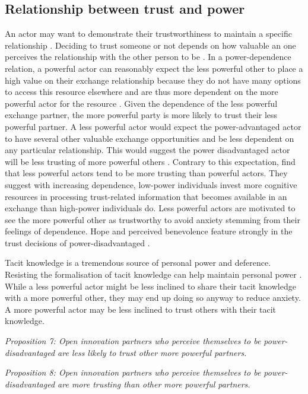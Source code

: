 \subsection{Relationship between trust and power}

An actor may want to demonstrate their trustworthiness to maintain a specific relationship \citep{schilke2015power}. Deciding to trust someone or not depends on how valuable an one perceives the relationship with the other person to be \citep{axelrod1984evolution}. In a power-dependence relation, a powerful actor can reasonably expect the less powerful other to place a high value on their exchange relationship because they do not have many options to access this resource elsewhere and are thus more dependent on the more powerful actor for the resource \citep{emerson1962power}. Given the dependence of the less powerful exchange partner, the more powerful party is more likely to trust their less powerful partner. A less powerful actor would expect the power-advantaged actor to have several other valuable exchange opportunities and be less dependent on any particular relationship. This would suggest the power disadvantaged actor will be less trusting of more powerful others \citep{schilke2015power}. Contrary to this expectation, \citet{schilke2015power} find that less powerful actors tend to be more trusting than powerful actors. They suggest with increasing dependence, low-power individuals invest more cognitive resources in processing trust-related information that becomes available in an exchange than high-power individuals do. Less powerful actors are motivated to see the more powerful other as trustworthy to avoid anxiety stemming from their feelings of dependence. Hope and perceived benevolence feature strongly in the trust decisions of power-disadvantaged \citep{schilke2015power}. \medskip

Tacit knowledge is a tremendous source of personal power and deference. Resisting the formalisation of tacit knowledge can help maintain personal power \citep{schultze2004knowing}. While a less powerful actor might be less inclined to share their tacit knowledge with a more powerful other, they may end up doing so anyway to reduce anxiety. A more powerful actor may be less inclined to trust others with their tacit knowledge. \medskip

\emph{Proposition 7: Open innovation partners who perceive themselves to be power-disadvantaged are less likely to trust other more powerful partners.}

\emph{Proposition 8: Open innovation partners who perceive themselves to be power-disadvantaged are more trusting than other more powerful partners.}

